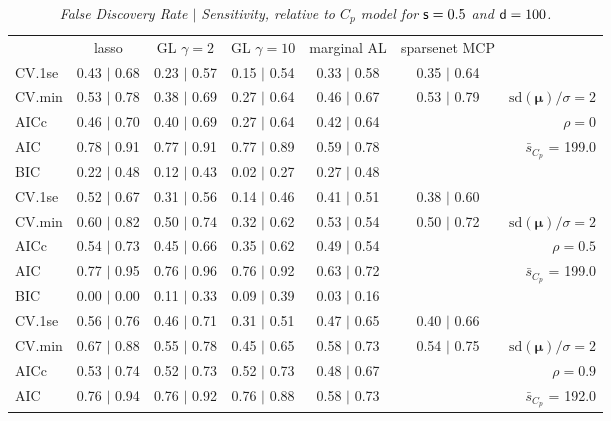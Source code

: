 \documentclass[12pt]{article}
\newcommand{\mr}[1]{\mathrm{#1}}
\newcommand{\bm}[1]{\mathbf{#1}}
\begin{document}
\begin{table}[p]\vspace{-.5cm}
\caption[l]{\label{sens}\it False Discovery Rate $\mid$ Sensitivity, relative to $C_p$ model  for ${\sf s}=0.5$ and ${\sf d}=100$.}
\vspace{-.5cm}
\small{}
\begin{center}
\begin{tabular}{l*{5}{c}|r}
 & lasso & GL $\gamma=2$ & GL $\gamma=10$ & marginal AL & sparsenet MCP  & \\
 \cline{1-7}
CV.1se & 0.43 $\mid$ 0.68 & 0.23 $\mid$ 0.57 & 0.15 $\mid$ 0.54 & 0.33 $\mid$ 0.58 & 0.35 $\mid$ 0.64 &\\
CV.min & 0.53 $\mid$ 0.78 & 0.38 $\mid$ 0.69 & 0.27 $\mid$ 0.64 & 0.46 $\mid$ 0.67 & 0.53 $\mid$ 0.79 &  $\mr{sd}(\bm{\mu})/\sigma=2$ \\
AICc & 0.46 $\mid$ 0.70 & 0.40 $\mid$ 0.69 & 0.27 $\mid$ 0.64 & 0.42 $\mid$ 0.64 & & $\rho=0$ \\
AIC & 0.78 $\mid$ 0.91 & 0.77 $\mid$ 0.91 & 0.77 $\mid$ 0.89 & 0.59 $\mid$ 0.78 & & \multirow{2}{*}{$\bar{s}_{C_p}$ = 199.0} \\
BIC & 0.22 $\mid$ 0.48 & 0.12 $\mid$ 0.43 & 0.02 $\mid$ 0.27 & 0.27 $\mid$ 0.48 & & \\
 \hline 
CV.1se & 0.52 $\mid$ 0.67 & 0.31 $\mid$ 0.56 & 0.14 $\mid$ 0.46 & 0.41 $\mid$ 0.51 & 0.38 $\mid$ 0.60 &\\
CV.min & 0.60 $\mid$ 0.82 & 0.50 $\mid$ 0.74 & 0.32 $\mid$ 0.62 & 0.53 $\mid$ 0.54 & 0.50 $\mid$ 0.72 &  $\mr{sd}(\bm{\mu})/\sigma=2$ \\
AICc & 0.54 $\mid$ 0.73 & 0.45 $\mid$ 0.66 & 0.35 $\mid$ 0.62 & 0.49 $\mid$ 0.54 & & $\rho=0.5$ \\
AIC & 0.77 $\mid$ 0.95 & 0.76 $\mid$ 0.96 & 0.76 $\mid$ 0.92 & 0.63 $\mid$ 0.72 & & \multirow{2}{*}{$\bar{s}_{C_p}$ = 199.0} \\
BIC & 0.00 $\mid$ 0.00 & 0.11 $\mid$ 0.33 & 0.09 $\mid$ 0.39 & 0.03 $\mid$ 0.16 & & \\
 \hline 
CV.1se & 0.56 $\mid$ 0.76 & 0.46 $\mid$ 0.71 & 0.31 $\mid$ 0.51 & 0.47 $\mid$ 0.65 & 0.40 $\mid$ 0.66 &\\
CV.min & 0.67 $\mid$ 0.88 & 0.55 $\mid$ 0.78 & 0.45 $\mid$ 0.65 & 0.58 $\mid$ 0.73 & 0.54 $\mid$ 0.75 &  $\mr{sd}(\bm{\mu})/\sigma=2$ \\
AICc & 0.53 $\mid$ 0.74 & 0.52 $\mid$ 0.73 & 0.52 $\mid$ 0.73 & 0.48 $\mid$ 0.67 & & $\rho=0.9$ \\
AIC & 0.76 $\mid$ 0.94 & 0.76 $\mid$ 0.92 & 0.76 $\mid$ 0.88 & 0.58 $\mid$ 0.73 & & \multirow{2}{*}{$\bar{s}_{C_p}$ = 192.0} \\

\end{tabular}
\end{center}
\end{table}
\end{document}
